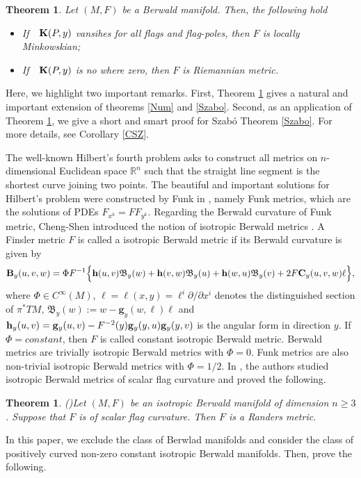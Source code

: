 \documentclass[12pt,a4paper]{article}
\newcounter{alphthm}
\newtheorem{propriete}[alphthm]{Theorem}
\newtheorem{thm}{Theorem}[section]
\theoremstyle{definition}
\numberwithin{equation}{section}
\begin{document}
\begin{thm}\label{MTHM}
Let $(M, F)$ be a Berwald manifold. Then, the following hold
\begin{itemize}
\item[1.] If\ \ ${\bf K}(P, y)$ vansihes for all flags and flag-poles, then $F$ is locally Minkowskian;
\item[2.] If\ \ ${\bf K}(P, y)$ is no where zero, then $F$ is Riemannian metric.
\end{itemize}
\end{thm}
Here, we highlight two important remarks. First, Theorem \ref{MTHM}  gives a natural and important extension of theorems \ref{Num} and \ref{Szabo}. Second, as an application of Theorem \ref{MTHM}, we give a short and smart proof for Szab\'{o}  Theorem \ref{Szabo}. For more details, see Corollary \ref{CSZ}.

\bigskip

The well-known  Hilbert's fourth problem asks to construct all metrics on $n$-dimensional Euclidean space $\mathbb{R}^n$ such that the straight line segment is the shortest curve joining two points. The beautiful and important solutions for Hilbert's problem were constructed by Funk in \cite{Fk2}, namely Funk metrics, which are  the solutions of PDEs $F_{x^k}=FF_{y^k}$. Regarding the Berwald curvature of Funk metric, Cheng-Shen introduced the notion of isotropic Berwald metrics \cite{CS}. A Finsler metric $F$ is called a isotropic Berwald metric  if its Berwald curvature is given by
\begin{eqnarray}\label{IBCurve}
{\bf B}_y(u,v,w)=\Phi F^{-1}\Big\{{\bf h}(u,v)\mathfrak{B}_y(w)+{\bf h}(v, w)\mathfrak{B}_y(u) +{\bf h}(w, u)\mathfrak{B}_y(v)+2F{\bf C}_y(u, v, w) \ell\Big\},
\end{eqnarray}
where $\Phi\in C^{\infty}(M)$,  $\ell=\ell(x, y)=\ell^i\partial/\partial x^i$ denotes the distinguished section of $\pi^*TM$, $\mathfrak{B}_y(w):=w-\textbf{g}_y(w,\ell)\ell$   and ${\bf h}_y(u,v)={\bf g}_y(u,v)-F^{-2}(y){\bf g}_y(y,u){\bf g}_y(y,v)$  is  the angular form in direction $y$. If $\Phi=constant$, then $F$ is called constant isotropic Berwald metric.  Berwald metrics are trivially isotropic Berwald metrics with $\Phi=0$. Funk metrics are also non-trivial isotropic Berwald metrics  with $\Phi=1/2$. In \cite{TN}, the authors studied  isotropic Berwald metrics of scalar flag curvature and proved the following.
\begin{propriete}{\rm (\cite{TN})}\label{TNX}
Let $(M, F)$ be an isotropic Berwald manifold of dimension $n\geq 3$. Suppose that $F$ is of scalar flag curvature. Then $F$ is a Randers metric.
\end{propriete}
In this paper, we exclude the class of Berwlad manifolds and consider the class of positively curved non-zero constant isotropic Berwald manifolds. Then, prove the following.
\end{document}

